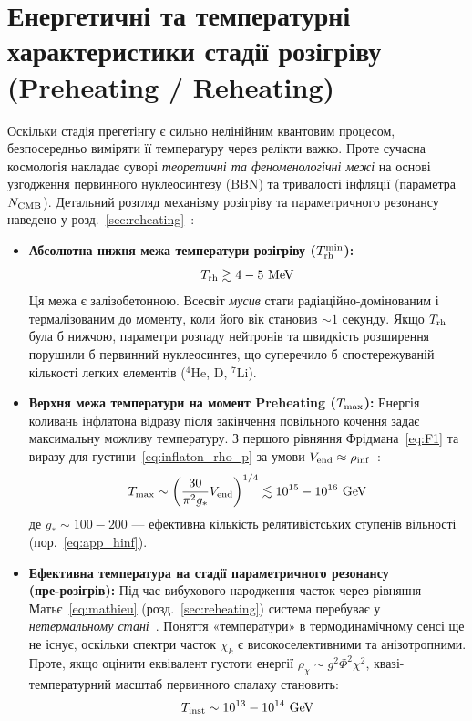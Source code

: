 \section{Енергетичні та температурні характеристики стадії розігріву (Preheating / Reheating)}

Оскільки стадія прегетінгу є сильно нелінійним квантовим процесом, безпосередньо виміряти її температуру через релікти важко. Проте сучасна космологія накладає суворі \textit{теоретичні та феноменологічні межі} на основі узгодження первинного нуклеосинтезу (BBN) та тривалості інфляції (параметра $N_{\rm CMB}$). Детальний розгляд механізму розігріву та параметричного резонансу наведено у розд.~\ref{sec:reheating}~\cite{kofman_1994,kofman_1997}:

\begin{itemize}
    \item \textbf{Абсолютна нижня межа температури розігріву ($T_{\rm rh}^{\rm min}$):}
    \[ T_{\rm rh} \gtrsim 4-5 \text{ MeV} \]
    Ця межа є залізобетонною. Всесвіт \textit{мусив} стати радіаційно-домінованим і термалізованим до моменту, коли його вік становив $\sim 1$ секунду. Якщо $T_{\rm rh}$ була б нижчою, параметри розпаду нейтронів та швидкість розширення порушили б первинний нуклеосинтез, що суперечило б спостережуваній кількості легких елементів ($^4\text{He}$, $\text{D}$, $^7\text{Li}$).

    \item \textbf{Верхня межа температури на момент Preheating ($T_{\rm max}$):}
    Енергія коливань інфлатона відразу після закінчення повільного кочення задає максимальну можливу температуру. З першого рівняння Фрідмана~\eqref{eq:F1} та виразу для густини~\eqref{eq:inflaton_rho_p} за умови $V_{\rm end} \approx \rho_{\rm inf}$~\cite{kofman_1997}:
    \[ T_{\rm max} \sim \left( \frac{30}{\pi^2 g_*} V_{\rm end} \right)^{1/4} \lesssim 10^{15} - 10^{16} \text{ GeV} \]
    де $g_* \sim 100-200$ --- ефективна кількість релятивістських ступенів вільності (пор.~\eqref{eq:app_hinf}).

    \item \textbf{Ефективна температура на стадії параметричного резонансу\\ (пре-розігрів):}
    Під час вибухового народження часток через рівняння Матьє~\eqref{eq:mathieu} (розд.~\ref{sec:reheating}) система перебуває у \textit{нетермальному стані}~\cite{kofman_1994}. Поняття «температури» в термодинамічному сенсі ще не існує, оскільки спектри часток $\chi_k$ є високоселективними та анізотропними. Проте, якщо оцінити еквівалент густоти енергії $\rho_\chi \sim g^2 \Phi^2 \chi^2$, квазі-температурний масштаб первинного спалаху становить:
    \[ T_{\rm inst} \sim 10^{13} - 10^{14} \text{ GeV} \]


\end{itemize}
